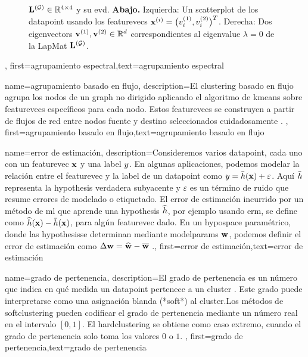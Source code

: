 {{\begin{figure}[H]
\begin{center}
{					${\bf L}^{(\mathcal{G})}  \in \mathbb{R}^{4 \times 4}$ y su \gls{evd}. 
					{\bf Abajo.} Izquierda: Un \gls{scatterplot} de los \gls{datapoint} usando los \gls{featurevec}s 
					${\bf x}^{(i)} = \big( v^{(1)}_{i},v^{(2)}_{i} \big)^{T}$. 
					Derecha: Dos \gls{eigenvector}s ${\bf v}^{(1)},{\bf v}^{(2)} \in \mathbb{R}^{d}$ 
					correspondientes al \gls{eigenvalue} $\lambda=0$ de la \gls{LapMat} ${\bf L}^{(\mathcal{G})}$. 
					} 
			\end{center}
		\end{figure}
	\newpage}, 
	first={agrupamiento espectral},text={agrupamiento espectral} 
}
{name={agrupamiento basado en flujo},
	description={El \gls{clustering} basado en flujo agrupa los nodos de un 
		\gls{graph} no dirigido aplicando el algoritmo de \gls{kmeans} sobre
		\gls{featurevec}s específicos para cada nodo. Estos \gls{featurevec}s se construyen a partir de flujos de red entre nodos 
		fuente y destino seleccionados cuidadosamente \cite{FlowSpecClustering2021}. }, 
	first={agrupamiento basado en flujo},text={agrupamiento basado en flujo} 
}



{name={error de estimación},
	description={Consideremos varios \gls{datapoint}, cada uno con un \gls{featurevec} ${\bf x}$ y una \gls{label} 
		$y$. En algunas aplicaciones, podemos modelar la relación entre el \gls{featurevec} y la \gls{label}
		de un \gls{datapoint} como $y = \bar{h}({\bf x}) + \varepsilon$. Aquí $\bar{h}$ 
		representa la \gls{hypothesis} verdadera subyacente y $\varepsilon$ es un término de ruido que resume errores de modelado o etiquetado.
		El error de estimación incurrido por un método de \gls{ml} que aprende una \gls{hypothesis} $\widehat{h}$, por ejemplo usando \gls{erm}, se define como 
		$\widehat{h}({\bf x}) - \bar{h}({\bf x})$, para algún \gls{featurevec} dado. 
		En un \gls{hypospace} paramétrico, donde las \gls{hypothesis}se determinan mediante
		\gls{modelparams} ${\bf w}$, podemos definir el error de estimación como  $\Delta {\bf w} = \widehat{{\bf w}} - \overline{{\bf w}}$ \cite{kay,hastie01statisticallearning}.},
	first={error de estimación},text={error de estimación} 
}


{name={grado de pertenencia},
	description={El grado de pertenencia es un número que indica en qué medida un \gls{datapoint} 
		pertenece a un \gls{cluster} \cite[Ch. 8]{MLBasics}. Este grado puede interpretarse 
		como una asignación blanda (*soft*) al \gls{cluster}.Los métodos de \Gls{softclustering} 
		pueden codificar el grado de pertenencia mediante un número real en el intervalo $[0,1]$. 
		El \Gls{hardclustering} se obtiene como caso extremo, cuando el grado de pertenencia solo toma los valores $0$ o $1$.
		}, 
		first={grado de pertenencia},text={grado de pertenencia} 
}

